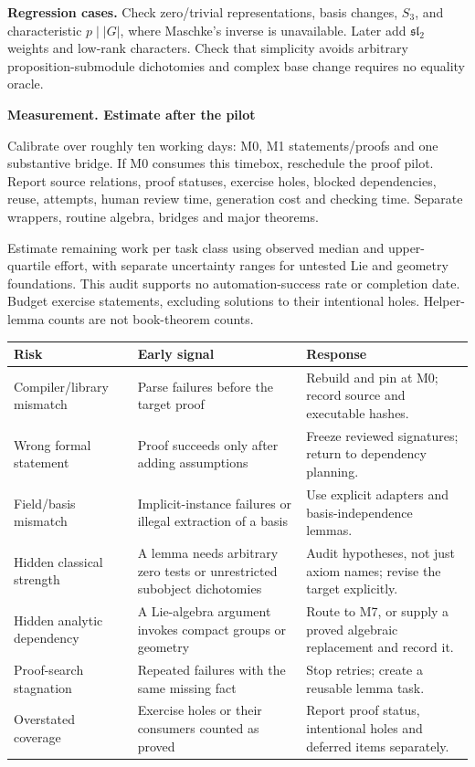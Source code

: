 \documentclass[11pt,a4paper]{article}
\newcommand{\slie}{\mathfrak{sl}}
\newcommand{\stage}[2]{\par\textbf{#1. #2}\par}
\begin{document}
\textbf{Regression cases.} Check zero/trivial representations, basis changes,
$S_3$, and characteristic $p\mid |G|$, where Maschke's inverse is unavailable.
Later add $\slie_2$ weights and low-rank characters. Check that simplicity
avoids arbitrary proposition-submodule dichotomies and complex base change
requires no equality oracle.

\stage{Measurement}{Estimate after the pilot}
Calibrate over roughly ten working days: M0, M1 statements/proofs and one
substantive bridge. If M0 consumes this timebox, reschedule the proof pilot.
Report source relations, proof statuses, exercise holes, blocked dependencies,
reuse, attempts, human review time, generation cost and checking time.
Separate wrappers, routine algebra, bridges and major theorems.

Estimate remaining work per task class using observed median and
upper-quartile effort, with separate uncertainty ranges for untested Lie and
geometry foundations. This audit supports no automation-success rate or
completion date. Budget exercise statements, excluding solutions to their
intentional holes. Helper-lemma counts are not book-theorem counts.

{\small
\begin{tabularx}{\linewidth}{@{}P{36mm}YY@{}}
\toprule
Risk & Early signal & Response \\
\midrule
Compiler/library mismatch & Parse failures before the target proof & Rebuild and pin at M0; record source and executable hashes. \\
Wrong formal statement & Proof succeeds only after adding assumptions & Freeze reviewed signatures; return to dependency planning. \\
Field/basis mismatch & Implicit-instance failures or illegal extraction of a basis & Use explicit adapters and basis-independence lemmas. \\
Hidden classical strength & A lemma needs arbitrary zero tests or unrestricted subobject dichotomies & Audit hypotheses, not just axiom names; revise the target explicitly. \\
Hidden analytic dependency & A Lie-algebra argument invokes compact groups or geometry & Route to M7, or supply a proved algebraic replacement and record it. \\
Proof-search stagnation & Repeated failures with the same missing fact & Stop retries; create a reusable lemma task. \\
Overstated coverage & Exercise holes or their consumers counted as proved & Report proof status, intentional holes and deferred items separately. \\
\bottomrule
\end{tabularx}}
\end{document}
